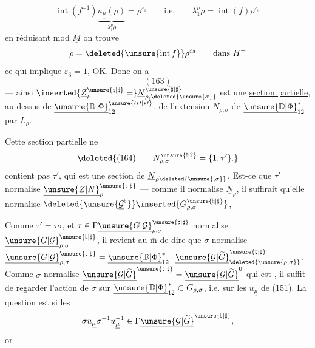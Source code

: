 \[
\operatorname{int}(f^{-1})\underbrace{u_{\underline\mu}(\rho)}_{\lambda_1^\nu\rho}
=\rho^{\varepsilon_3}\qquad\text{i.e.}\qquad
\lambda_1^\nu\rho=\operatorname{int}(f)\rho^{\varepsilon_3}
\]
en réduisant mod $\underline M$ on trouve
\[
\rho=\deleted{\unsure{\operatorname{int}f}}\rho^{\varepsilon_3}\qquad\text{dans }H^+
\]
ce qui implique $\varepsilon_3=1$, OK. Donc on a
\[
(163)
\]
--- ainsi $\inserted{\underline Z_\rho^{\unsure{\natural|\sharp}}=}\underline N_{\rho,\deleted{\unsure{\sigma}}}^{\unsure{\natural|\sharp}}$ est une \uline{section partielle}, au dessus de $\underline{\unsure{\mathbb D|\Phi}}_{12}^{\unsure{\prime*\prime|*\prime}}$, de l'extension $N_{\rho,\sigma}$ de $\underline{\unsure{\mathbb D|\Phi}}_{12}^{*}$ par $L_\rho$.

 Cette section partielle ne
\[
\deleted{(164)\qquad N_{\rho,\sigma}^{\unsure{!|?}}=\{1,\tau'\}.}
\]
contient pas $\tau'$, qui est une section de $\underline N_{\rho\deleted{\unsure{,\sigma}}}$. Est-ce que $\tau'$ normalise $\underline{\unsure{Z|N}}_\rho^{\unsure{\natural|\sharp}}$ --- comme il normalise $\underline N_\rho$, il suffirait qu'elle normalise
$\deleted{\unsure{\underline{\mathcal G}^{\natural}}}\inserted{\underline G_{\rho,\sigma}^{\unsure{\natural|\sharp}}}$,

Comme $\tau'=\tau\sigma$,  et
$\tau\in\Gamma\underline{\unsure{G|\mathcal G}}_{\rho,\sigma}^{\unsure{\natural|\sharp}}$
normalise $\underline{\unsure{G|\mathcal G}}_{\rho,\sigma}^{\unsure{\natural|\sharp}}$,
il revient au $\overline{\mathrm m}$ de dire que $\sigma$ normalise
$\underline{\unsure{G|\mathcal G}}_{\rho,\sigma}^{\unsure{\natural|\sharp}}
=\underline{\unsure{\mathbb D|\Phi}}_{12}^{*}\cdot\underline{\unsure{\mathcal G|\widetilde G}}^{\unsure{\natural|\sharp}}_{\deleted{\unsure{\rho,\sigma}}}$.
Comme $\sigma$ normalise $\underline{\unsure{\mathcal G|\widetilde G}}^{\unsure{\natural|\sharp}}=\underline{\unsure{\mathcal G|\widetilde G}}^0$ qui est , il suffit de regarder l'action de $\sigma$ sur $\underline{\unsure{\mathbb D|\Phi}}_{12}^{*}\subset G_{\rho,\sigma}$,  i.e. sur les $u_{\underline\mu}$ de (151). La question est si les
\[
\sigma u_{\underline\mu}\sigma^{-1}u_{\underline\mu}^{-1}\in\Gamma\underline{\unsure{\mathcal G|\widetilde G}}^{\unsure{\natural|\sharp}},
\]
or

